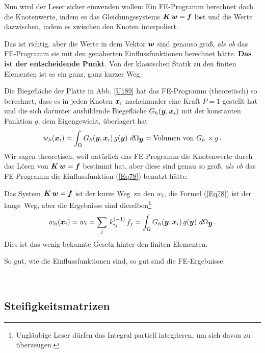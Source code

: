 Nun wird der Leser sicher einwenden wollen: Ein FE-Programm berechnet doch die Knotenwerte, indem es das Gleichungssystems $\mbox{\boldmath $K$}\,\mbox{\boldmath $w$} = \mbox{\boldmath $f$}$ l\"{o}st und die Werte dazwischen, indem es zwischen den Knoten interpoliert.

Das ist richtig, aber die Werte in dem Vektor $\mbox{\boldmath $w$}$ sind genauso gro{\ss}, {\em als ob\/} das FE-Programm sie mit den gen\"{a}herten Einflussfunktionen berechnet h\"{a}tte. {\bf Das ist der entscheidende Punkt}. Von der klassischen Statik zu den finiten Elementen ist es ein ganz, ganz kurzer Weg.

Die Biegefl\"{a}che der Platte in Abb. \ref{U189} hat das FE-Programm (theoretisch) so berechnet, dass es in jeden Knoten $\mbox{\boldmath $x$}_i$ nacheinander eine Kraft $P = 1$ gestellt hat und die sich darunter ausbildende Biegefl\"{a}che $G_h(\mbox{\boldmath $y$},\mbox{\boldmath $x$}_i)$ mit der konstanten Funktion $g$, dem Eigengewicht, \"{u}berlagert hat
\begin{align}\label{Eq78}
w_h(\mbox{\boldmath $x$}_i) = \int_{\Omega} G_h(\mbox{\boldmath $y$}, \mbox{\boldmath $x$}_i)\,g(\mbox{\boldmath $y$})\,\,d\Omega_{\mbox{\boldmath $y$}} = \text{Volumen von $G_h$ $\times\,g$}\,.
\end{align}
Wir sagen theoretisch, weil nat\"{u}rlich das FE-Programm die Knotenwerte durch das L\"{o}sen von $\mbox{\boldmath $K$}\,\mbox{\boldmath $w$} = \mbox{\boldmath $f$}$ bestimmt hat, aber diese sind  genau so gro{\ss}, {\em als ob\/} das FE-Programm die Einflussfunktion (\ref{Eq78}) benutzt h\"{a}tte.

Das System $\mbox{\boldmath $K$}\,\mbox{\boldmath $w$} = \mbox{\boldmath $f$}$ ist der \glq kurze Weg\grq\ zu den $w_i$, die Formel (\ref{Eq78}) ist der \glq lange\grq\ Weg, aber die Ergebnisse sind dieselben\footnote{Ungl\"{a}ubige Leser d\"{u}rfen das Integral partiell integrieren, um sich davon zu \"{u}berzeugen.}
\begin{align}
w_h(\mbox{\boldmath $x$}_i) = w_i = \sum_j\,k_{ij}^{(-1)}\,f_j = \int_{\Omega} G_h(\mbox{\boldmath $y$}, \mbox{\boldmath $x$}_i)\,g(\mbox{\boldmath $y$})\,\,d\Omega_{\mbox{\boldmath $y$}}\,.
\end{align}
Dies ist das wenig bekannte Gesetz hinter den finiten Elementen. \\

\hspace*{-12pt}\colorbox{highlightBlue}{\parbox{0.98\textwidth}{{ So gut, wie die Einflussfunktionen sind, so gut sind die FE-Ergebnisse.}}}\\

\vspace{-1cm}
{\textcolor{sectionTitleBlue}{\section{Steifigkeitsmatrizen}}}\label{Steifigkeitsmatrizen}

